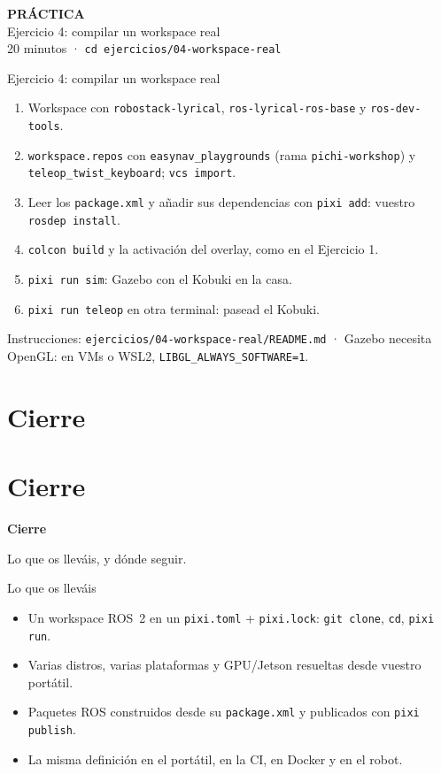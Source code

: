 \documentclass[aspectratio=169]{beamer}
\newcommand{\practicaframe}[2]{%
\begin{frame}
  \centering
  \vfill
  {\Large \textbf{PRÁCTICA}}\\[1em]
  {\large #1}\\[0.5em]
  {\color{halfgray} #2}
  \vfill
\end{frame}%
}
\newcommand{\separador}[2]{%
\begin{frame}
  \centering
  \vfill
  {\usebeamercolor[fg]{structure}\fontsize{34}{40}\selectfont\bfseries #1\par}
  \vspace{1.2em}
  {\Large\color{halfgray} #2\par}
  \vfill
\end{frame}%
}
\newcommand{\seccion}[3][]{%
  \if\relax\detokenize{#1}\relax\section{#2}\else\section[#1]{#2}\fi
  \separador{#2}{#3}%
}
\begin{document}
\practicaframe{Ejercicio 4: compilar un workspace real}{20 minutos · \texttt{cd ejercicios/04-workspace-real}}

\begin{frame}{Ejercicio 4: compilar un workspace real}
\begin{enumerate}
    \item Workspace con \texttt{robostack-lyrical}, \lstinline|ros-lyrical-ros-base| y \lstinline|ros-dev-tools|.
    \item \lstinline|workspace.repos| con \texttt{easynav\_playgrounds} (rama \texttt{pichi-workshop}) y \texttt{teleop\_twist\_keyboard}; \lstinline|vcs import|.
    \item Leer los \lstinline|package.xml| y añadir sus dependencias con \lstinline|pixi add|: vuestro \lstinline|rosdep install|.
    \item \lstinline|colcon build| y la activación del overlay, como en el Ejercicio 1.
    \item \lstinline|pixi run sim|: Gazebo con el Kobuki en la casa.
    \item \lstinline|pixi run teleop| en otra terminal: pasead el Kobuki.
\end{enumerate}
\vfill
\small Instrucciones: \texttt{ejercicios/04-workspace-real/README.md} · Gazebo necesita OpenGL: en VMs o WSL2, \lstinline|LIBGL_ALWAYS_SOFTWARE=1|.
\end{frame}

\seccion{Cierre}{Lo que os lleváis, y dónde seguir.}

\begin{frame}{Lo que os lleváis}
\begin{itemize}
    \item Un workspace ROS~2 en un \lstinline|pixi.toml| + \lstinline|pixi.lock|: \lstinline|git clone|, \lstinline|cd|, \lstinline|pixi run|.
    \item Varias distros, varias plataformas y GPU/Jetson resueltas desde vuestro portátil.
    \item Paquetes ROS construidos desde su \lstinline|package.xml| y publicados con \lstinline|pixi publish|.
    \item La misma definición en el portátil, en la CI, en Docker y en el robot.
\end{itemize}
\end{frame}
\end{document}
